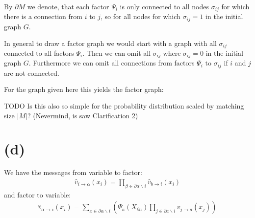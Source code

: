 \documentclass[a4paper]{scrartcl}
\begin{document}
By $\partial M$ we denote, that each factor $\Psi_i$ is only connected to all nodes $\sigma_{ij}$ for which there is a connection from $i$ to $j$, so for all nodes for which $\sigma_{ij} = 1$ in the initial graph $G$.


In general to draw a factor graph we would start with a graph with all $\sigma_{ij}$ connected to all factors $\Psi_i$. Then we can omit all $\sigma_{ij}$ where $\sigma_{ij} = 0$ in the initial graph $G$. Furthermore we can omit all connections from factors $\Psi_i$ to $\sigma_{ij}$ if $i$ and $j$ are not connected. 

For the graph given here this yields the factor graph:




{\color{red}
TODO Is this also so simple for the probability distribution scaled by matching size $\lvert M \rvert$? (Nevermind, is saw Clarification 2)
}











\section*{(d)}

We have the messages from variable to factor:
\begin{align}
    \hat{v}_{i \rightarrow \alpha}(x_i) = \prod_{\beta \in \partial \alpha \backslash i} \hat{v}_{b \rightarrow i}(x_i)
\end{align}
and factor to variable:
\begin{align}
    \hat{v}_{\alpha \rightarrow i}(x_i) = \sum_{x \in \partial \alpha \backslash i} (\Psi_a(X_{\partial a}) \prod_{j \in \partial a \backslash i} v_{j \rightarrow a}(x_j))
\end{align}
\end{document}

